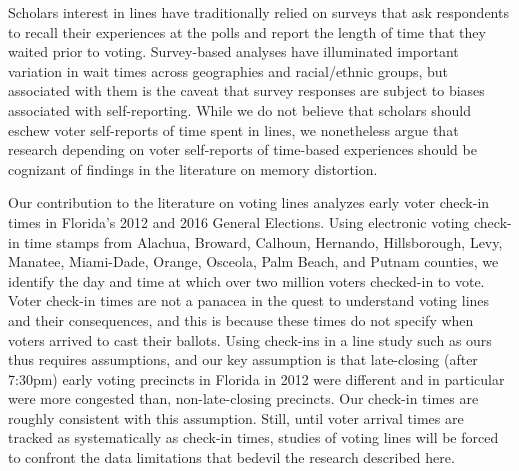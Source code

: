\documentclass[12pt,titlepage]{article}
\begin{document}

Scholars interest in lines have traditionally relied on surveys that
ask respondents to recall their experiences at the polls and report
the length of time that they waited prior to voting. Survey-based
analyses have illuminated important variation in wait times across
geographies and racial/ethnic groups, but associated with them is the
caveat that survey responses are subject to biases associated with
self-reporting. While we do not believe that scholars should eschew
voter self-reports of time spent in lines, we nonetheless argue that
research depending on voter self-reports of time-based experiences
should be cognizant of findings in the literature on memory
distortion.



Our contribution to the literature on voting lines analyzes early
voter check-in times in Florida's 2012 and 2016 General Elections.
Using electronic voting check-in time stamps from Alachua, Broward,
Calhoun, Hernando, Hillsborough, Levy, Manatee, Miami-Dade, Orange,
Osceola, Palm Beach, and Putnam counties, we identify the day and time
at which over two million voters checked-in to vote.  Voter check-in
times are not a panacea in the quest to understand voting lines and
their consequences, and this is because these times do not specify
when voters arrived to cast their ballots. Using check-ins in a line
study such as ours thus requires assumptions, and our key assumption
is that late-closing (after 7:30pm) early voting precincts in Florida
in 2012 were different and in particular were more congested than,
non-late-closing precincts. Our check-in times are roughly consistent
with this assumption. Still, until voter arrival times are tracked as
systematically as check-in times, studies of voting lines will be
forced to confront the data limitations that bedevil the research
described here.
\end{document}
